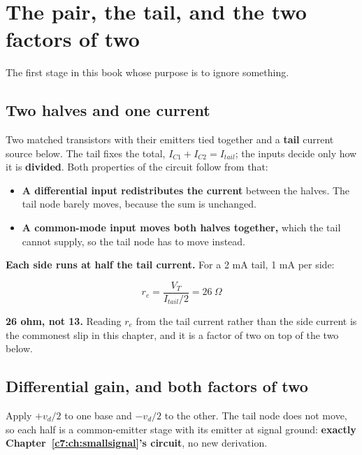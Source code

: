 
\section{The pair, the tail, and the two factors of two}
\label{c9:app:a}

The first stage in this book whose purpose is to ignore something.

\subsection{Two halves and one current}
\label{c9:sec:a1}

Two matched transistors with their emitters tied together and a \textbf{tail} current source below. The tail fixes the total, $I_{C1} + I_{C2} = I_{tail}$; the inputs decide only how it is \textbf{divided}. Both properties of the circuit follow from that:

\begin{itemize}
  \item \textbf{A differential input redistributes the current} between the halves. The tail node barely moves, because the sum is unchanged.
  \item \textbf{A common-mode input moves both halves together,} which the tail cannot supply, so the tail node has to move instead.
\end{itemize}
\textbf{Each side runs at half the tail current.} For a 2 mA tail, 1 mA per side:

\[
  r_e = \frac{V_T}{I_{tail}/2} = 26\ \Omega
\]

\textbf{26 ohm, not 13.} Reading $r_e$ from the tail current rather than the side current is the commonest slip in this chapter, and it is a factor of two on top of the two below.

\subsection{Differential gain, and both factors of two}
\label{c9:sec:a2}
Apply $+v_d/2$ to one base and $-v_d/2$ to the other. The tail node does not move, so each half is a common-emitter stage with its emitter at signal ground: \textbf{exactly Chapter~\ref{c7:ch:smallsignal}'s circuit}, no new derivation.

